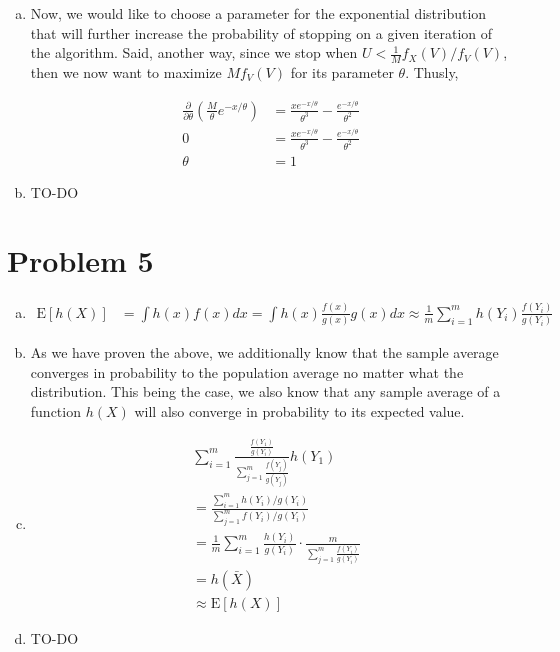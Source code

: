 \documentclass[11pt]{article}
\begin{document}
\begin{enumerate}[(a)]
  \item Now, we would like to choose a parameter for the exponential
    distribution that will further increase the probability of
    stopping on a given iteration of the algorithm.  Said, another
    way, since we stop when $U < \frac{1}{M} f_X(V)/f_V(V)$, then we
    now want to maximize $M f_V(V)$ for its parameter $\theta$.  Thusly,

    \begin{align*}
      \frac{\partial}{\partial \theta} \left( \frac{M}{\theta}
      e^{-x/\theta} \right) &= \frac{x e^{-x/\theta}}{\theta^3} -
                              \frac{e^{-x/\theta}}{\theta^2} \\
      0 &= \frac{x e^{-x/\theta}}{\theta^3}
          -\frac{e^{-x/\theta}}{\theta^2} \\
      \theta &= 1
    \end{align*}

  \item TO-DO

\end{enumerate}

\section*{Problem 5}

\begin{enumerate}[(a)]
  \item 
    \begin{align*}
      \mathrm{E}[h(X)] &= \int h(x) f(x) dx = \int h(x)
      \frac{f(x)}{g(x)} g(x) dx \approx \frac{1}{m} \sum_{i=1}^m
      h(Y_i) \frac{f(Y_i)}{g(Y_i)}
    \end{align*}

  \item As we have proven the above, we additionally know that the
    sample average converges in probability to the population average
    no matter what the distribution.  This being the case, we also
    know that any sample average of a function $h(X)$ will also
    converge in probability to its expected value.

  \item 
    \begin{align*}
      &\sum_{i=1}^m \frac{\frac{f(Y_1)}{g(Y_i)}}{\sum_{j=1}^m
        \frac{f(Y_j)}{g(Y_j)}} h(Y_1) \\ 
      &= \frac{\sum_{i=1}^m
        h(Y_i)/g(Y_i)}{\sum_{j=1}^m f(Y_i)/g(Y_i)} \\
      &= \frac{1}{m} \sum_{i=1}^m \frac{h(Y_i)}{g(Y_i)} \cdot
      \frac{m}{\sum_{j=1}^m \frac{f(Y_i)}{g(Y_i)}} \\
      &= h(\bar{X}) \\
      &\approx \mathrm{E}[h(X)]
    \end{align*}

  \item TO-DO

\end{enumerate}
\end{document}
